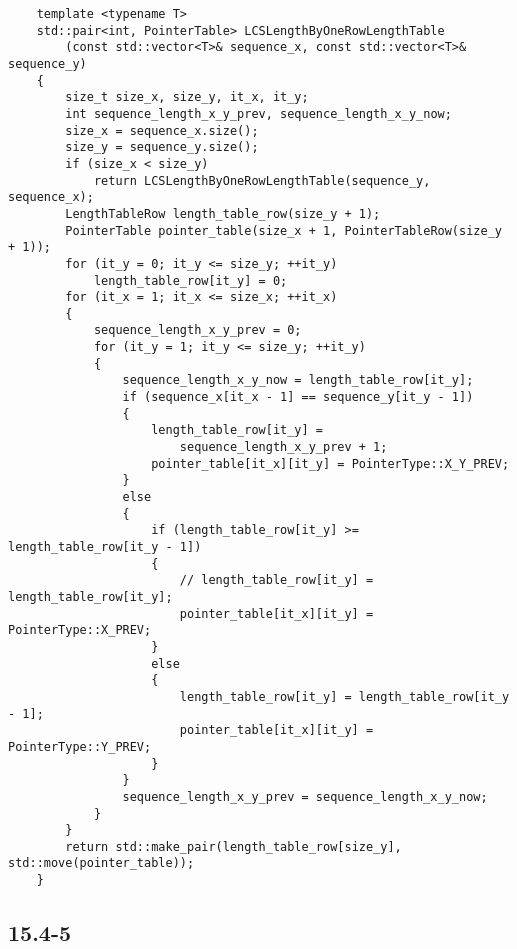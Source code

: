 \begin{verbatim}
    template <typename T>
    std::pair<int, PointerTable> LCSLengthByOneRowLengthTable
        (const std::vector<T>& sequence_x, const std::vector<T>& sequence_y) 
    {
        size_t size_x, size_y, it_x, it_y;
        int sequence_length_x_y_prev, sequence_length_x_y_now;
        size_x = sequence_x.size();
        size_y = sequence_y.size();
        if (size_x < size_y)
            return LCSLengthByOneRowLengthTable(sequence_y, sequence_x);
        LengthTableRow length_table_row(size_y + 1);
        PointerTable pointer_table(size_x + 1, PointerTableRow(size_y + 1));
        for (it_y = 0; it_y <= size_y; ++it_y)
            length_table_row[it_y] = 0;
        for (it_x = 1; it_x <= size_x; ++it_x) 
        {
            sequence_length_x_y_prev = 0;
            for (it_y = 1; it_y <= size_y; ++it_y) 
            {
                sequence_length_x_y_now = length_table_row[it_y];
                if (sequence_x[it_x - 1] == sequence_y[it_y - 1]) 
                {
                    length_table_row[it_y] = 
                        sequence_length_x_y_prev + 1;
                    pointer_table[it_x][it_y] = PointerType::X_Y_PREV;
                } 
                else 
                {
                    if (length_table_row[it_y] >= length_table_row[it_y - 1]) 
                    {
                        // length_table_row[it_y] = length_table_row[it_y];
                        pointer_table[it_x][it_y] = PointerType::X_PREV;
                    } 
                    else 
                    {
                        length_table_row[it_y] = length_table_row[it_y - 1];
                        pointer_table[it_x][it_y] = PointerType::Y_PREV;
                    }
                }
                sequence_length_x_y_prev = sequence_length_x_y_now;
            }
        }
        return std::make_pair(length_table_row[size_y], std::move(pointer_table));
    }
\end{verbatim}

\subsection*{15.4-5}

